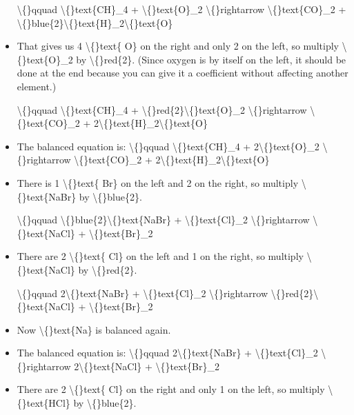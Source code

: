 \documentclass{article}
\begin{document}
\begin{itemize}
                    \textbackslash\{\}qquad
                        \textbackslash\{\}text\{CH\}\_4 + \textbackslash\{\}text\{O\}\_2 \textbackslash\{\}rightarrow \textbackslash\{\}text\{CO\}\_2 + \textbackslash\{\}blue\{2\}\textbackslash\{\}text\{H\}\_2\textbackslash\{\}text\{O\}
  \item That gives us 4 \textbackslash\{\}text\{ O\} on the right and
                        only 2 on the left, so multiply
                        \textbackslash\{\}text\{O\}\_2 by \textbackslash\{\}red\{2\}.
                        (Since oxygen is by itself on the left, it should be done
                        at the end because you can give it a coefficient without
                        affecting another element.)
                    
                    \textbackslash\{\}qquad
                        \textbackslash\{\}text\{CH\}\_4 + \textbackslash\{\}red\{2\}\textbackslash\{\}text\{O\}\_2 \textbackslash\{\}rightarrow \textbackslash\{\}text\{CO\}\_2 + 2\textbackslash\{\}text\{H\}\_2\textbackslash\{\}text\{O\}
  \item The balanced equation is:
                    \textbackslash\{\}qquad
                        \textbackslash\{\}text\{CH\}\_4 + 2\textbackslash\{\}text\{O\}\_2 \textbackslash\{\}rightarrow \textbackslash\{\}text\{CO\}\_2 + 2\textbackslash\{\}text\{H\}\_2\textbackslash\{\}text\{O\}
  \item There is 1 \textbackslash\{\}text\{ Br\} on the left and
                        2 on the right, so multiply
                        \textbackslash\{\}text\{NaBr\} by \textbackslash\{\}blue\{2\}.
                    
                    \textbackslash\{\}qquad
                        \textbackslash\{\}blue\{2\}\textbackslash\{\}text\{NaBr\} + \textbackslash\{\}text\{Cl\}\_2 \textbackslash\{\}rightarrow \textbackslash\{\}text\{NaCl\} + \textbackslash\{\}text\{Br\}\_2
  \item There are 2 \textbackslash\{\}text\{ Cl\} on the left and
                        1 on the right, so multiply
                        \textbackslash\{\}text\{NaCl\} by \textbackslash\{\}red\{2\}.
                    
                    \textbackslash\{\}qquad
                        2\textbackslash\{\}text\{NaBr\} + \textbackslash\{\}text\{Cl\}\_2 \textbackslash\{\}rightarrow \textbackslash\{\}red\{2\}\textbackslash\{\}text\{NaCl\} + \textbackslash\{\}text\{Br\}\_2
  \item Now \textbackslash\{\}text\{Na\} is balanced again.
  \item The balanced equation is:
                    \textbackslash\{\}qquad
                        2\textbackslash\{\}text\{NaBr\} + \textbackslash\{\}text\{Cl\}\_2 \textbackslash\{\}rightarrow 2\textbackslash\{\}text\{NaCl\} + \textbackslash\{\}text\{Br\}\_2
  \item There are 2 \textbackslash\{\}text\{ Cl\} on the right and
                        only 1 on the left, so multiply
                        \textbackslash\{\}text\{HCl\} by \textbackslash\{\}blue\{2\}.
                    

\end{itemize}
\end{document}
